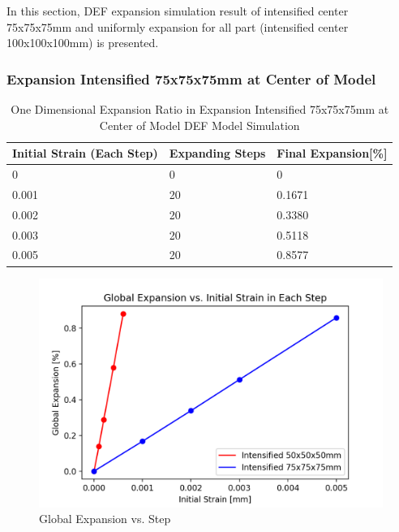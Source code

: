 In this section, DEF expansion simulation result of intensified center 75x75x75mm and uniformly expansion for all part (intensified center 100x100x100mm) is presented.

\subsubsection{Expansion Intensified 75x75x75mm at Center of Model}

\begin{table}[ht!]
\centering
\begin{tabular}{ ||p{2cm}|p{2cm}|p{2cm}| }
 \hline
    Initial Strain (Each Step) & Expanding Steps &  Final Expansion[\%] \\ [0.5ex]
 \hline\hline
  0 & 0 & 0  \\
  0.001 & 20 & 0.1671 \\
  0.002 & 20 & 0.3380 \\
  0.003 & 20 & 0.5118 \\
  0.005 & 20 & 0.8577 \\
 \hline
\end{tabular}
\caption{One Dimensional Expansion Ratio in Expansion Intensified 75x75x75mm at Center of Model DEF Model Simulation}
\label{table:DEF_X-5_EXP}
\end{table}

\begin{figure}[ht!]
\centering
\includegraphics[width=.8\linewidth]{Files/exp_plot/DEFA30X0vsX-5_exp.png}
  \caption{Global Expansion vs. Step}
  \label{fig:DEFA30X0vsX-5_exp}
\end{figure}

